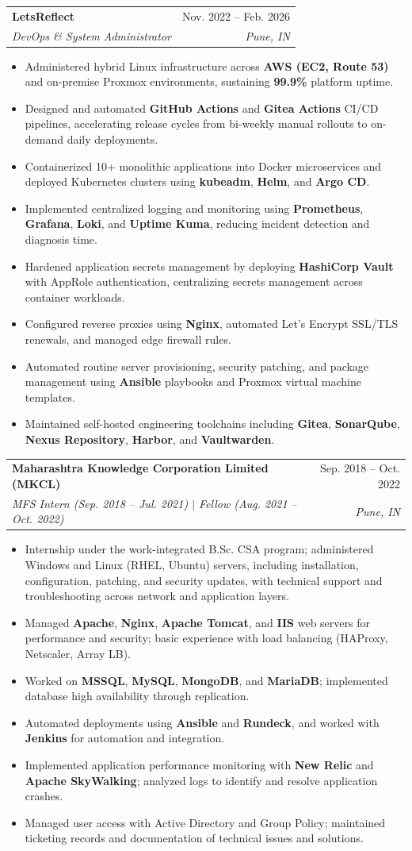 \documentclass[letterpaper,11pt]{article}
\makeatletter
\newcommand{\resumeItem}[1]{
  \item\small{
    {#1 \vspace{-3pt}}
  }
}
\newcommand{\resumeSubheading}[4]{
  \vspace{-2pt}\item
    \begin{tabular*}{0.97\textwidth}[t]{l@{\extracolsep{\fill}}r}
      \textbf{#1} & #2 \\
      \textit{\small#3} & \textit{\small #4} \\
    \end{tabular*}\vspace{-7pt}
}
\newcommand{\resumeItemListStart}{\begin{itemize}}
\newcommand{\resumeItemListEnd}{\end{itemize}\vspace{-5pt}}
\makeatother
\begin{document}
\resumeSubheading
{LetsReflect}{Nov. 2022 -- Feb. 2026}
{DevOps \& System Administrator}{Pune, IN}
\resumeItemListStart
\resumeItem{Administered hybrid Linux infrastructure across \textbf{AWS (EC2, Route 53)} and on-premise Proxmox environments, sustaining \textbf{99.9\%} platform uptime.}
\resumeItem{Designed and automated \textbf{GitHub Actions} and \textbf{Gitea Actions} CI/CD pipelines, accelerating release cycles from bi-weekly manual rollouts to on-demand daily deployments.}
\resumeItem{Containerized 10+ monolithic applications into Docker microservices and deployed Kubernetes clusters using \textbf{kubeadm}, \textbf{Helm}, and \textbf{Argo CD}.}
\resumeItem{Implemented centralized logging and monitoring using \textbf{Prometheus}, \textbf{Grafana}, \textbf{Loki}, and \textbf{Uptime Kuma}, reducing incident detection and diagnosis time.}
\resumeItem{Hardened application secrets management by deploying \textbf{HashiCorp Vault} with AppRole authentication, centralizing secrets management across container workloads.}
\resumeItem{Configured reverse proxies using \textbf{Nginx}, automated Let's Encrypt SSL/TLS renewals, and managed edge firewall rules.}
\resumeItem{Automated routine server provisioning, security patching, and package management using \textbf{Ansible} playbooks and Proxmox virtual machine templates.}
\resumeItem{Maintained self-hosted engineering toolchains including \textbf{Gitea}, \textbf{SonarQube}, \textbf{Nexus Repository}, \textbf{Harbor}, and \textbf{Vaultwarden}.}
\resumeItemListEnd

\resumeSubheading
{Maharashtra Knowledge Corporation Limited (MKCL)}{Sep. 2018 -- Oct. 2022}
{MFS Intern (Sep. 2018 -- Jul. 2021) $|$ Fellow (Aug. 2021 -- Oct. 2022)}{Pune, IN}
\resumeItemListStart
\resumeItem{Internship under the work-integrated B.Sc. CSA program; administered Windows and Linux (RHEL, Ubuntu) servers, including installation, configuration, patching, and security updates, with technical support and troubleshooting across network and application layers.}
\resumeItem{Managed \textbf{Apache}, \textbf{Nginx}, \textbf{Apache Tomcat}, and \textbf{IIS} web servers for performance and security; basic experience with load balancing (HAProxy, Netscaler, Array LB).}
\resumeItem{Worked on \textbf{MSSQL}, \textbf{MySQL}, \textbf{MongoDB}, and \textbf{MariaDB}; implemented database high availability through replication.}
\resumeItem{Automated deployments using \textbf{Ansible} and \textbf{Rundeck}, and worked with \textbf{Jenkins} for automation and integration.}
\resumeItem{Implemented application performance monitoring with \textbf{New Relic} and \textbf{Apache SkyWalking}; analyzed logs to identify and resolve application crashes.}
\resumeItem{Managed user access with Active Directory and Group Policy; maintained ticketing records and documentation of technical issues and solutions.}
\resumeItemListEnd
\end{document}
